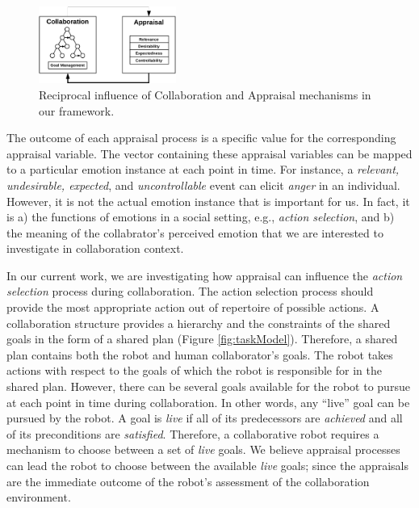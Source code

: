 \documentclass[conference]{IEEEtran}
\begin{document}
\begin{figure}[tbh]
  \centering
  \includegraphics[width=0.40\textwidth]{figure/ActionSelection-croped.pdf}
  \vspace*{-2mm}
  \caption{{\fontsize{9}{9}\selectfont Reciprocal influence of Collaboration
  and Appraisal mechanisms in our framework.}}
  \label{fig:actionSelection}
  \vspace*{-3mm}
\end{figure}

The outcome of each appraisal process is a specific value for the corresponding
appraisal variable. The vector containing these appraisal variables can be
mapped to a particular emotion instance at each point in time. For instance, a
\textit{relevant, undesirable, expected}, and \textit{uncontrollable} event can
elicit \textit{anger} in an individual. However, it is not the actual emotion
instance that is important for us. In fact, it is a) the functions of emotions
in a social setting, e.g., \textit{action selection}, and b) the meaning of
the collabrator's perceived emotion that we are interested to investigate in
collaboration context.

In our current work, we are investigating how appraisal can influence the
\textit{action selection} process during collaboration. The action selection
process should provide the most appropriate action out of repertoire of possible
actions. A collaboration structure provides a hierarchy and the constraints of
the shared goals in the form of a shared plan (Figure \ref{fig:taskModel}).
Therefore, a shared plan contains both the robot and human collaborator's goals.
The robot takes actions with respect to the goals of which the robot is
responsible for in the shared plan. However, there can be several goals
available for the robot to pursue at each point in time during collaboration.
In other words, any ``live'' goal can be pursued by the robot. A goal is
\textit{live} if all of its predecessors are \textit{achieved} and all of its
preconditions are \textit{satisfied}. Therefore, a collaborative robot requires
a mechanism to choose between a set of \textit{live} goals. We believe appraisal
processes can lead the robot to choose between the available \textit{live}
goals; since the appraisals are the immediate outcome of the robot's assessment
of the collaboration environment. 
\end{document}

